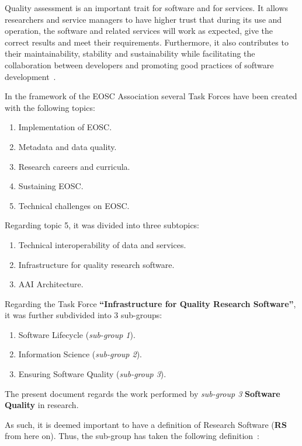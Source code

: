 Quality assessment is an important trait for software and for services. It allows researchers and service managers to have higher trust that during its use and operation, the software and related services will work as expected, give the correct results and meet their requirements. Furthermore, it also contributes to their maintainability, stability and sustainability while facilitating the collaboration between developers and promoting good practices of software development~\cite{eosc_synergyD31}.

In the framework of the EOSC Association several Task Forces have been created with the following topics:

\begin{enumerate}
    \item Implementation of EOSC.
    \item Metadata and data quality.
    \item Research careers and curricula.
    \item Sustaining EOSC.
    \item Technical challenges on EOSC.
\end{enumerate}

Regarding topic 5, it was divided into three subtopics:

\begin{enumerate}
    \item Technical interoperability of data and services.
    \item Infrastructure for quality research software.
    \item AAI Architecture.
\end{enumerate}

Regarding the Task Force \textbf{``Infrastructure for Quality Research Software''}, it was further subdivided into 3 sub-groups:

\begin{enumerate}
    \item Software Lifecycle (\textit{sub-group 1}).
    \item Information Science (\textit{sub-group 2}).
    \item Ensuring Software Quality (\textit{sub-group 3}).
\end{enumerate}

The present document regards the work performed by \textit{sub-group 3} \textbf{Software Quality} in research.

As such, it is deemed important to have a definition of Research Software (\textbf{RS} from here on). Thus, the sub-group has taken the following definition~\cite{gruenpeter_defining_2021}: 

